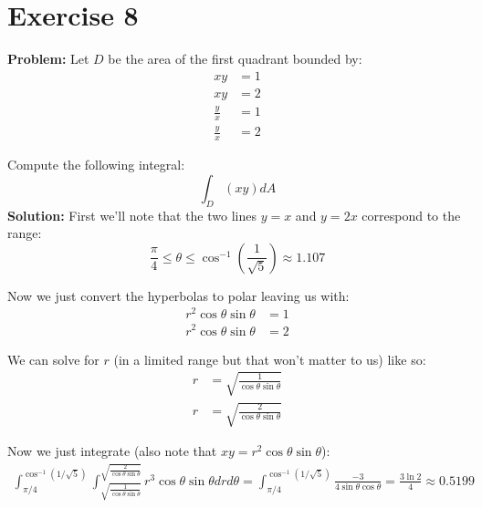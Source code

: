 \documentclass{article}
\begin{document}
\section*{Exercise 8}
\textbf{Problem:} Let $D$ be the area of the first quadrant bounded by:
\begin{align*}
  xy&=1\\
  xy&=2\\
  \frac{y}{x}&=1\\
  \frac{y}{x}&=2
\end{align*}

Compute the following integral:
$$\int_D\left(xy\right)dA$$
\textbf{Solution:} First we'll note that the two lines $y=x$ and $y=2x$ correspond to the range:
$$\frac{\pi}{4}\le\theta\le\cos^{-1}\left(\frac{1}{\sqrt 5}\right)\approx1.107$$

Now we just convert the hyperbolas to polar leaving us with:
\begin{align*}
  r^2\cos\theta\sin\theta&=1\\
  r^2\cos\theta\sin\theta&=2
\end{align*}

We can solve for $r$ (in a limited range but that won't matter to us) like so:
\begin{align*}
  r&=\sqrt{\frac{1}{\cos\theta\sin\theta}}\\
  r&=\sqrt{\frac{2}{\cos\theta\sin\theta}}
\end{align*}

Now we just integrate (also note that $xy=r^2\cos\theta\sin\theta$):
\begin{align*}
  \int_{\pi/4}^{\cos^{-1}(1/\sqrt 5)}\int_{\sqrt{\frac{1}{\cos\theta\sin\theta}}}^{\sqrt{\frac{2}{\cos\theta\sin\theta}}}r^3\cos\theta\sin\theta dr d\theta=\int_{\pi/4}^{\cos^{-1}(1/\sqrt 5)}\frac{-3}{4\sin\theta\cos\theta}=\frac{3\ln 2}{4}\approx0.5199
\end{align*}

%
\end{document}
